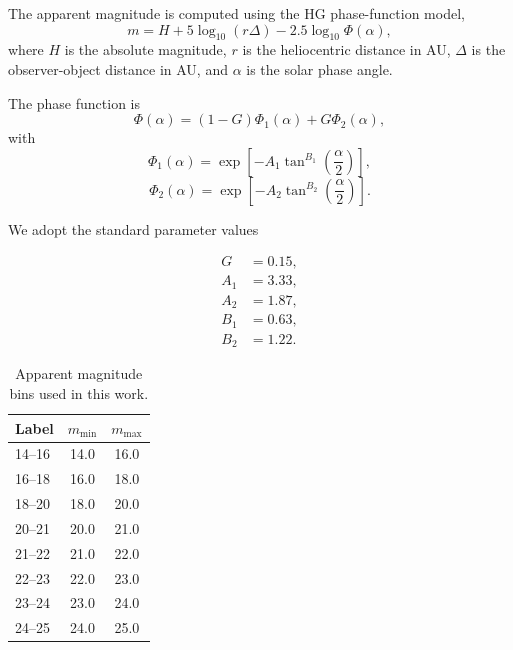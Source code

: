 \documentclass[linenumbers,trackchanges,twocolumn]{aastex701}
\begin{document}
The apparent magnitude is computed using the HG phase-function model,
\begin{equation}
m = H + 5\log_{10}(r\Delta) - 2.5\log_{10}\Phi(\alpha),
\end{equation}
where \(H\) is the absolute magnitude, \(r\) is the heliocentric distance in AU,
\(\Delta\) is the observer-object distance in AU, and \(\alpha\) is the solar
phase angle.

The phase function is
\begin{equation}
\Phi(\alpha) = (1-G)\Phi_1(\alpha) + G\Phi_2(\alpha),
\end{equation}
with
\begin{equation}
\Phi_1(\alpha) =
\exp\left[-A_1\tan^{B_1}\left(\frac{\alpha}{2}\right)\right],
\end{equation}
\begin{equation}
\Phi_2(\alpha) =
\exp\left[-A_2\tan^{B_2}\left(\frac{\alpha}{2}\right)\right].
\end{equation}

We adopt the standard parameter values

\begin{equation}
\begin{aligned}
 G &= 0.15, \\
 A_1 &= 3.33, \\
 A_2 &= 1.87, \\
 B_1 &= 0.63, \\
 B_2 &= 1.22.
\end{aligned}
\end{equation}


\begin{table}[h!]
\centering
\begin{tabular}{lcc}
\hline
\textbf{Label} & \textbf{$m_{\min}$} & \textbf{$m_{\max}$} \\
\hline
14--16  & 14.0 & 16.0 \\
16--18  & 16.0 & 18.0 \\
18--20  & 18.0 & 20.0 \\
20--21  & 20.0 & 21.0 \\
21--22  & 21.0 & 22.0 \\
22--23  & 22.0 & 23.0 \\
23--24  & 23.0 & 24.0 \\
24--25  & 24.0 & 25.0 \\
\hline
\end{tabular}
\caption{Apparent magnitude bins used in this work.}
\label{tab:mag_bins}
\end{table}
\end{document}
